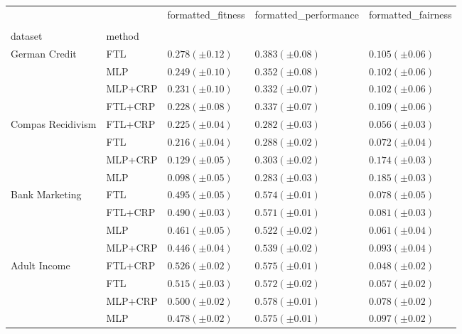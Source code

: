 \begin{tabular}{lllll}
\toprule
 &  & formatted_fitness & formatted_performance & formatted_fairness \\
 &  &  &  &  \\
dataset & method &  &  &  \\
\midrule
\multirow[t]{4}{*}{German Credit} & FTL & $0.278 (\pm0.12)$ & $0.383 (\pm0.08)$ & $0.105 (\pm0.06)$ \\
 & MLP & $0.249 (\pm0.10)$ & $0.352 (\pm0.08)$ & $0.102 (\pm0.06)$ \\
 & MLP+CRP & $0.231 (\pm0.10)$ & $0.332 (\pm0.07)$ & $0.102 (\pm0.06)$ \\
 & FTL+CRP & $0.228 (\pm0.08)$ & $0.337 (\pm0.07)$ & $0.109 (\pm0.06)$ \\
\cline{1-5}
\multirow[t]{4}{*}{Compas Recidivism} & FTL+CRP & $0.225 (\pm0.04)$ & $0.282 (\pm0.03)$ & $0.056 (\pm0.03)$ \\
 & FTL & $0.216 (\pm0.04)$ & $0.288 (\pm0.02)$ & $0.072 (\pm0.04)$ \\
 & MLP+CRP & $0.129 (\pm0.05)$ & $0.303 (\pm0.02)$ & $0.174 (\pm0.03)$ \\
 & MLP & $0.098 (\pm0.05)$ & $0.283 (\pm0.03)$ & $0.185 (\pm0.03)$ \\
\cline{1-5}
\multirow[t]{4}{*}{Bank Marketing} & FTL & $0.495 (\pm0.05)$ & $0.574 (\pm0.01)$ & $0.078 (\pm0.05)$ \\
 & FTL+CRP & $0.490 (\pm0.03)$ & $0.571 (\pm0.01)$ & $0.081 (\pm0.03)$ \\
 & MLP & $0.461 (\pm0.05)$ & $0.522 (\pm0.02)$ & $0.061 (\pm0.04)$ \\
 & MLP+CRP & $0.446 (\pm0.04)$ & $0.539 (\pm0.02)$ & $0.093 (\pm0.04)$ \\
\cline{1-5}
\multirow[t]{4}{*}{Adult Income} & FTL+CRP & $0.526 (\pm0.02)$ & $0.575 (\pm0.01)$ & $0.048 (\pm0.02)$ \\
 & FTL & $0.515 (\pm0.03)$ & $0.572 (\pm0.02)$ & $0.057 (\pm0.02)$ \\
 & MLP+CRP & $0.500 (\pm0.02)$ & $0.578 (\pm0.01)$ & $0.078 (\pm0.02)$ \\
 & MLP & $0.478 (\pm0.02)$ & $0.575 (\pm0.01)$ & $0.097 (\pm0.02)$ \\
\cline{1-5}
\bottomrule
\end{tabular}
